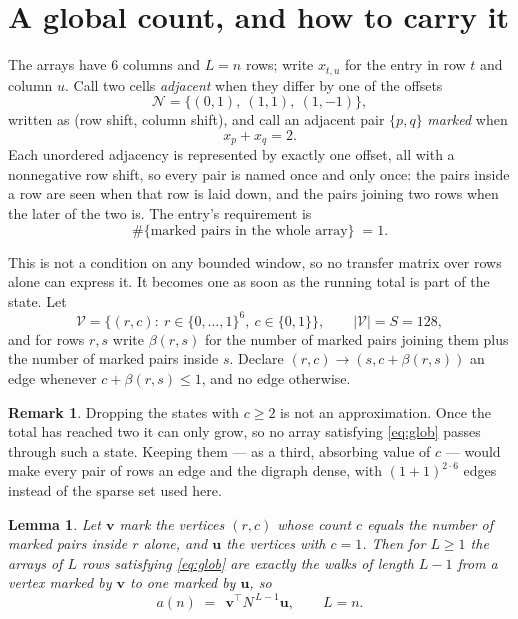 \documentclass[11pt,a4paper]{article}
\theoremstyle{plain}
\newtheorem{lemma}[theorem]{Lemma}
\theoremstyle{definition}
\newtheorem{remark}[theorem]{Remark}
\begin{document}
\section{A global count, and how to carry it}

The arrays have $6$ columns and $L=n$ rows; write $x_{t,u}$ for the entry in
row $t$ and column $u$. Call two cells \emph{adjacent} when they differ by one of the
offsets
\[
\mathcal N=\{(0,1),\ (1,1),\ (1,-1)\},
\]
written as (row shift, column shift), and call an adjacent pair $\{p,q\}$
\emph{marked} when
\[
x_{p}+x_{q}=2 .
\]
Each unordered adjacency is represented by exactly one offset, all with a nonnegative row
shift, so every pair is named once and only once: the pairs inside a row are seen when
that row is laid down, and the pairs joining two rows when the later of the two is. The
entry's requirement is
\begin{equation}\label{eq:glob}
\#\{\text{marked pairs in the whole array}\}\;=1.
\end{equation}

This is not a condition on any bounded window, so no transfer matrix over rows alone can
express it. It becomes one as soon as the running total is part of the state. Let
\[
\mathcal V=\bigl\{(r,c):\ r\in\{0,\dots,1\}^{6},\ c\in\{0,1\}\bigr\},
\qquad |\mathcal V|=S=128,
\]
and for rows $r,s$ write $\beta(r,s)$ for the number of marked pairs joining them plus the
number of marked pairs inside $s$. Declare $(r,c)\to(s,c+\beta(r,s))$ an edge whenever
$c+\beta(r,s)\le1$, and no edge otherwise.

\begin{remark}
Dropping the states with $c\ge2$ is not an approximation. Once the total has reached two it
can only grow, so no array satisfying \eqref{eq:glob} passes through such a state. Keeping
them --- as a third, absorbing value of $c$ --- would make every pair of rows an edge and
the digraph dense, with $(1+1)^{2\cdot6}$ edges instead of the sparse set used here.
\end{remark}

\begin{lemma}\label{lem:walk}
Let $\mathbf{v}$ mark the vertices $(r,c)$ whose count $c$ equals the number of marked pairs
inside $r$ alone, and $\mathbf{u}$ the vertices with $c=1$. Then for $L\ge1$ the arrays
of $L$ rows satisfying \eqref{eq:glob} are exactly the walks of length $L-1$ from a
vertex marked by $\mathbf{v}$ to one marked by $\mathbf{u}$, so
\[
a(n)\;=\;\,\mathbf{v}^{\!\top}N^{\,L-1}\mathbf{u},\qquad L=n .
\]
\end{lemma}
\end{document}
